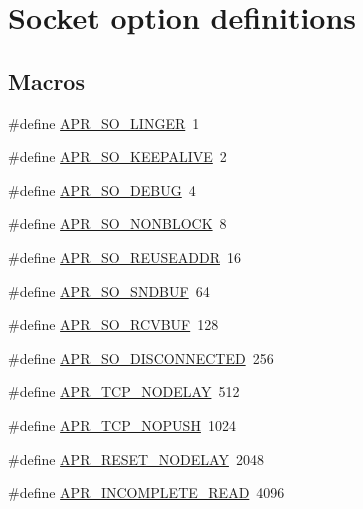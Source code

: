 \hypertarget{group__apr__sockopt}{\section{Socket option definitions}
\label{group__apr__sockopt}
}
\subsection*{Macros}
\begin{DoxyCompactItemize}
\item 
\#define \hyperlink{group__apr__sockopt_ga6a807e7b78937ab74a4fcd6e99d76669}{A\-P\-R\-\_\-\-S\-O\-\_\-\-L\-I\-N\-G\-E\-R}~1
\item 
\#define \hyperlink{group__apr__sockopt_ga0c54c5b98593d9ad2f8cc8836da7eae5}{A\-P\-R\-\_\-\-S\-O\-\_\-\-K\-E\-E\-P\-A\-L\-I\-V\-E}~2
\item 
\#define \hyperlink{group__apr__sockopt_ga2b30d26f69059692e97a59ec1d6db73b}{A\-P\-R\-\_\-\-S\-O\-\_\-\-D\-E\-B\-U\-G}~4
\item 
\#define \hyperlink{group__apr__sockopt_gac3bf19cc28b43da9b9dc396c84914a0f}{A\-P\-R\-\_\-\-S\-O\-\_\-\-N\-O\-N\-B\-L\-O\-C\-K}~8
\item 
\#define \hyperlink{group__apr__sockopt_ga90434074950efa1383d7c5649026a159}{A\-P\-R\-\_\-\-S\-O\-\_\-\-R\-E\-U\-S\-E\-A\-D\-D\-R}~16
\item 
\#define \hyperlink{group__apr__sockopt_ga0e7ef8d3785eec5210ede9fd309db35f}{A\-P\-R\-\_\-\-S\-O\-\_\-\-S\-N\-D\-B\-U\-F}~64
\item 
\#define \hyperlink{group__apr__sockopt_ga4ab9494893075c8db6ac26a997f41f0e}{A\-P\-R\-\_\-\-S\-O\-\_\-\-R\-C\-V\-B\-U\-F}~128
\item 
\#define \hyperlink{group__apr__sockopt_ga5fd72839e254ddec03ffb624c21fa564}{A\-P\-R\-\_\-\-S\-O\-\_\-\-D\-I\-S\-C\-O\-N\-N\-E\-C\-T\-E\-D}~256
\item 
\#define \hyperlink{group__apr__sockopt_ga24db924d850dea792e92be7f8bc45cbd}{A\-P\-R\-\_\-\-T\-C\-P\-\_\-\-N\-O\-D\-E\-L\-A\-Y}~512
\item 
\#define \hyperlink{group__apr__sockopt_ga7679a9e3114815eb6c31d26db707975d}{A\-P\-R\-\_\-\-T\-C\-P\-\_\-\-N\-O\-P\-U\-S\-H}~1024
\item 
\#define \hyperlink{group__apr__sockopt_gac9ee12e841eefaf86fabaae4a298adea}{A\-P\-R\-\_\-\-R\-E\-S\-E\-T\-\_\-\-N\-O\-D\-E\-L\-A\-Y}~2048
\item 
\#define \hyperlink{group__apr__sockopt_ga73b6c80791c5148c2a416e03a8a1ff8a}{A\-P\-R\-\_\-\-I\-N\-C\-O\-M\-P\-L\-E\-T\-E\-\_\-\-R\-E\-A\-D}~4096

\end{DoxyCompactItemize}

